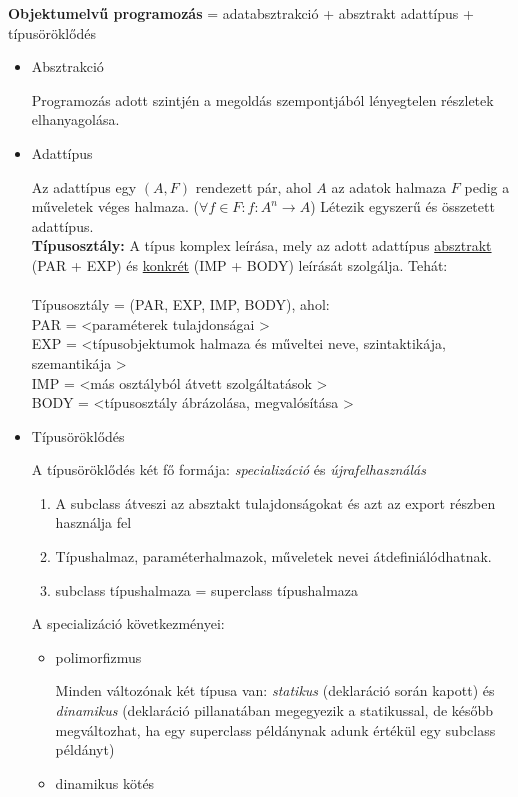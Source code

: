 \documentclass[margin=0px]{article}
\begin{document}
		\textbf{Objektumelvű programozás} = adatabsztrakció + absztrakt adattípus + típusöröklődés
		\begin{itemize}
			\item Absztrakció
			
				Programozás adott szintjén a megoldás szempontjából
				lényegtelen részletek elhanyagolása.
				
			\item Adattípus
				
				Az adattípus egy $ (A,F) $ rendezett pár, ahol $ A $ az adatok halmaza $ F $ pedig a műveletek véges halmaza. ($ \forall f \in F : f:A^n \rightarrow A $) Létezik egyszerű és összetett adattípus.\\
				\textbf{Típusosztály:} A típus komplex leírása, mely az adott adattípus \underline{absztrakt} (PAR + EXP) és \underline{konkrét} (IMP + BODY) leírását szolgálja. Tehát:\\\\
				Típusosztály = (PAR, EXP, IMP, BODY), ahol:\\
				PAR = \textless paraméterek tulajdonságai \textgreater\\
				EXP = \textless típusobjektumok halmaza és műveltei neve, szintaktikája, szemantikája \textgreater\\
				IMP = \textless más osztályból átvett szolgáltatások \textgreater\\
				BODY = \textless típusosztály ábrázolása, megvalósítása \textgreater\\
				
			\item Típusöröklődés
				
				A típusöröklődés két fő formája: \textit{specializáció} és  \textit{újrafelhasználás}
				\begin{enumerate}
					\item A subclass átveszi az absztakt tulajdonságokat és azt az export részben használja fel
					\item Típushalmaz, paraméterhalmazok, műveletek nevei átdefiniálódhatnak.
					\item subclass típushalmaza = superclass típushalmaza
				\end{enumerate}
				 
				 A specializáció következményei:
				 \begin{itemize}
				 	\item polimorfizmus
				 	
					 	Minden változónak két típusa van: \textit{statikus} (deklaráció során kapott) és \textit{dinamikus} (deklaráció pillanatában megegyezik a statikussal, de később megváltozhat, ha egy superclass példánynak adunk értékül egy subclass példányt)
				 	\item dinamikus kötés
				 	

\end{itemize}
\end{itemize}
\end{document}
